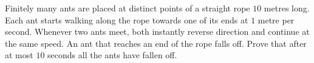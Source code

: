 Finitely many ants are placed at distinct points of a straight rope $10$ metres long. Each ant starts walking along the rope towards one of its ends at $1$ metre per second. Whenever two ants meet, both instantly reverse direction and continue at the same speed. An ant that reaches an end of the rope falls off. Prove that after at most $10$ seconds all the ants have fallen off.
